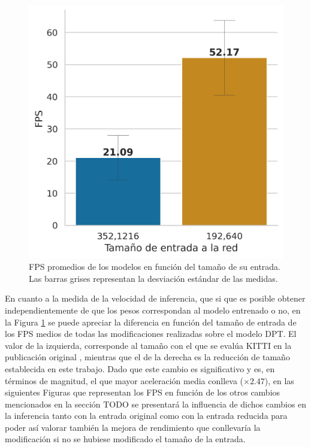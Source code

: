 \begin{figure}
\vspace{-10pt}
\includegraphics[width=0.95\linewidth]{imagenes/Resultados/velocidad_inferencia_entrada.png} 
\caption{FPS promedios de los modelos en función del tamaño de su entrada. Las barras grises representan la desviación estándar de las medidas.}
\label{fig:resultados-inf-tam-entrada}
\end{figure}

En cuanto a la medida de la velocidad de inferencia, que si que es posible obtener independientemente de que los pesos correspondan al modelo entrenado o no, en la Figura \ref{fig:resultados-inf-tam-entrada} se puede apreciar la diferencia en función del tamaño de entrada de los FPS medios de todas las modificaciones realizadas sobre el modelo DPT. El valor de la izquierda, corresponde al tamaño con el que se evalúa KITTI en la publicación original \cite{visiontransformerDPT}, mientras que el de la derecha es la reducción de tamaño establecida en este trabajo. Dado que este cambio es significativo y es, en términos de magnitud, el que mayor aceleración media conlleva ($\times2.47$), en las siguientes Figuras que representan los FPS en función de los otros cambios mencionados en la sección TODO se presentará la influencia de dichos cambios en la inferencia tanto con la entrada original como con la entrada reducida para poder así valorar también la mejora de rendimiento que conllevaría la modificación si no se hubiese modificado el tamaño de la entrada.

